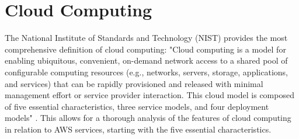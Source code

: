 \section{Cloud Computing}
The National Institute of Standards and Technology (NIST) provides the most comprehensive definition of cloud computing: "Cloud computing is a model for enabling ubiquitous, convenient, on-demand network access to a shared pool of configurable computing resources (e.g., networks, servers, storage, applications, and services) that can be rapidly provisioned and released with minimal management effort or service provider interaction. This cloud model is composed of five essential characteristics, three service models, and four deployment models" \cite{NISTCloudComputing}. This allows for a thorough analysis of the features of cloud computing in relation to AWS services, starting with the five essential characteristics.

